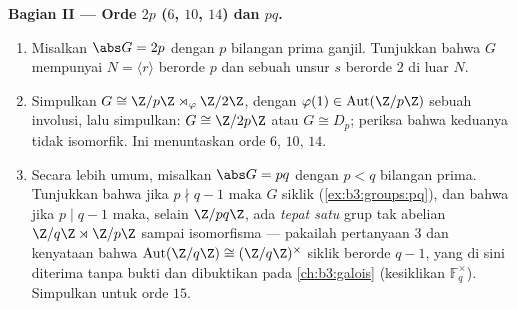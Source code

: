 \begin{problem}
\medskip
\noindent\textbf{Bagian II --- Orde $2p$ ($6$, $10$, $14$) dan
$pq$.}
\begin{enumerate}[resume]
  \item Misalkan $\abs G = 2p$ dengan $p$ bilangan prima ganjil. Tunjukkan bahwa $G$ mempunyai
         $N = \langle r \rangle$ berorde $p$ dan
        sebuah unsur $s$ berorde $2$ di luar $N$.
  \item Simpulkan $G \cong \Z/p\Z \rtimes_\varphi \Z/2\Z$, dengan
        $\varphi(1) \in \operatorname{Aut}(\Z/p\Z)$ sebuah
        involusi, lalu simpulkan: $G \cong \Z/2p\Z$ atau $G \cong
        D_p$; periksa bahwa keduanya tidak isomorfik. Ini menuntaskan
        orde $6$, $10$, $14$.
  \item Secara lebih umum, misalkan $\abs G = pq$ dengan $p < q$ bilangan prima.
        Tunjukkan bahwa jika $p \nmid q-1$ maka $G$ siklik
        (\cref{ex:b3:groups:pq}), dan bahwa jika $p \mid q - 1$ maka,
        selain $\Z/pq\Z$, ada \emph{tepat satu} grup tak abelian
        $\Z/q\Z \rtimes \Z/p\Z$ sampai isomorfisma --- pakailah pertanyaan
        3 dan kenyataan bahwa $\operatorname{Aut}(\Z/q\Z) \cong
        (\Z/q\Z)^\times$ siklik berorde $q - 1$, yang di sini diterima tanpa bukti
        dan dibuktikan pada \cref{ch:b3:galois} (kesiklikan
        $\mathbb F_q^\times$). Simpulkan untuk orde $15$.
\end{enumerate}


\end{problem}
